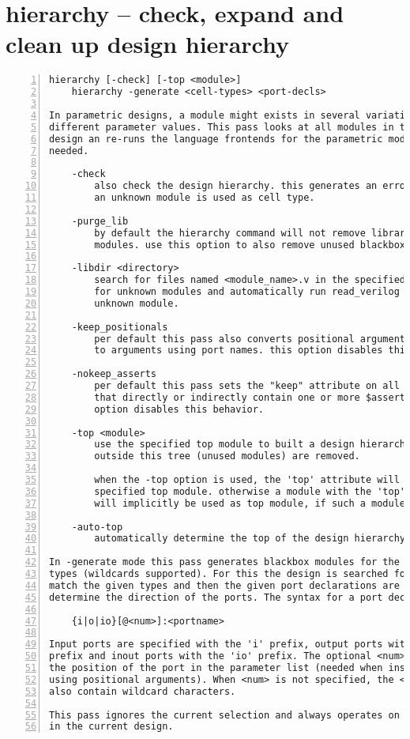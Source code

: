 \section{hierarchy -- check, expand and clean up design hierarchy}
\label{cmd:hierarchy}
\begin{lstlisting}[numbers=left,frame=single]
    hierarchy [-check] [-top <module>]
    hierarchy -generate <cell-types> <port-decls>

In parametric designs, a module might exists in several variations with
different parameter values. This pass looks at all modules in the current
design an re-runs the language frontends for the parametric modules as
needed.

    -check
        also check the design hierarchy. this generates an error when
        an unknown module is used as cell type.

    -purge_lib
        by default the hierarchy command will not remove library (blackbox)
        modules. use this option to also remove unused blackbox modules.

    -libdir <directory>
        search for files named <module_name>.v in the specified directory
        for unknown modules and automatically run read_verilog for each
        unknown module.

    -keep_positionals
        per default this pass also converts positional arguments in cells
        to arguments using port names. this option disables this behavior.

    -nokeep_asserts
        per default this pass sets the "keep" attribute on all modules
        that directly or indirectly contain one or more $assert cells. this
        option disables this behavior.

    -top <module>
        use the specified top module to built a design hierarchy. modules
        outside this tree (unused modules) are removed.

        when the -top option is used, the 'top' attribute will be set on the
        specified top module. otherwise a module with the 'top' attribute set
        will implicitly be used as top module, if such a module exists.

    -auto-top
        automatically determine the top of the design hierarchy and mark it.

In -generate mode this pass generates blackbox modules for the given cell
types (wildcards supported). For this the design is searched for cells that
match the given types and then the given port declarations are used to
determine the direction of the ports. The syntax for a port declaration is:

    {i|o|io}[@<num>]:<portname>

Input ports are specified with the 'i' prefix, output ports with the 'o'
prefix and inout ports with the 'io' prefix. The optional <num> specifies
the position of the port in the parameter list (needed when instantiated
using positional arguments). When <num> is not specified, the <portname> can
also contain wildcard characters.

This pass ignores the current selection and always operates on all modules
in the current design.
\end{lstlisting}

